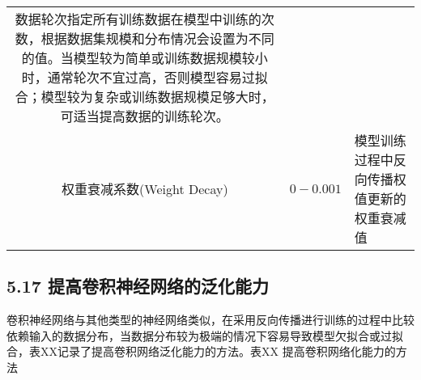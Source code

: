 \begin{longtable}[]{ ccl }
\begin{minipage}[t]{0.08\columnwidth}
数据轮次指定所有训练数据在模型中训练的次数，根据数据集规模和分布情况会设置为不同的值。当模型较为简单或训练数据规模较小时，通常轮次不宜过高，否则模型容易过拟合；模型较为复杂或训练数据规模足够大时，可适当提高数据的训练轮次。\strut
\end{minipage}\tabularnewline
\begin{minipage}[t]{0.09\columnwidth}\centering\strut
权重衰减系数(Weight Decay)\strut
\end{minipage} & \begin{minipage}[t]{0.10\columnwidth}\centering\strut
\(0-0.001\)\strut
\end{minipage} & \begin{minipage}[t]{0.08\columnwidth}\raggedright\strut
模型训练过程中反向传播权值更新的权重衰减值\strut
\end{minipage}\tabularnewline
\bottomrule
\end{longtable}

\subsection{5.17
提高卷积神经网络的泛化能力}\label{ux63d0ux9ad8ux5377ux79efux795eux7ecfux7f51ux7edcux7684ux6cdbux5316ux80fdux529b}

​
卷积神经网络与其他类型的神经网络类似，在采用反向传播进行训练的过程中比较依赖输入的数据分布，当数据分布较为极端的情况下容易导致模型欠拟合或过拟合，表XX记录了提高卷积网络泛化能力的方法。
​ 表XX 提高卷积网络化能力的方法

